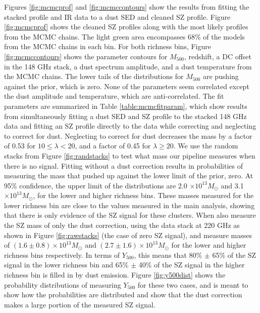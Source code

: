 \documentclass[a4paper,fleqn,usenatbib]{mnras}
\begin{document}






Figures \ref{fig:mcmcprof} and \ref{fig:mcmccontours} show the results from fitting the stacked profile and IR data to a dust SED and cleaned SZ profile. Figure \ref{fig:mcmcprof} shows the cleaned SZ profiles along with the most likely profiles from the MCMC chains. The light green area encompasses 68\% of the models from the MCMC chains in each bin.  For both richness bins, Figure \ref{fig:mcmccontours} shows the parameter contours for $M_{500}$, redshift, a DC offset in the 148 GHz stack, a dust spectrum amplitude, and a dust temperature from the MCMC chains. The lower tails of the distributions for $M_{500}$ are pushing against the prior, which is zero. None of the parameters seem correlated except the dust amplitude and temperature, which are anti-correlated. 
The fit parameters are summarized in Table \ref{table:mcmcfitparam}, which show results from simultaneously fitting a dust SED and SZ profile to the stacked 148 GHz data and fitting an SZ profile directly to the data while correcting and neglecting to correct for dust. Neglecting to correct for dust decreases the mass by a factor of 0.53 for $10 \leq \lambda < 20$, and a factor of 0.45 for $\lambda \geq 20$. %
We use the random stacks from Figure \ref{fig:randstacks} to test what mass our pipeline measures when there is no signal. Fitting without a dust correction results in probabilities of measuring the mass that pushed up against the lower limit of the prior, zero. At 95\% confidence, the upper limit of the distributions are 2.0 $\times 10^{13} M_{\odot}$ and 3.1 $\times 10^{13} M_{\odot}$, for the lower and higher richness bins. These masses measured for the lower richness bin are close to the values measured in the main analysis, showing that there is only evidence of the SZ signal for these clusters. 
When also measure the SZ mass of only the dust correction, using the data stack at 220 GHz as shown in Figure \ref{fig:rawstacks} (the case of zero SZ signal), and measure masses of $(1.6 \pm 0.8) \times 10^{13} M_{\odot}$ and $(2.7 \pm 1.6) \times 10^{13} M_{\odot}$ for the lower and higher richness bins respectively. In terms of $Y_{500}$, this means that 80\% $\pm$ 65\% of the SZ signal in the lower richness bin and 65\% $\pm$ 40\% of the SZ signal in the higher richness bin is filled in by dust emission. Figure \ref{fig:y500dist} shows the probability distributions of measuring $Y_{500}$ for these two cases, and is meant to show how the probabilities are distributed and show that the dust correction makes a large portion of the measured SZ signal. 
\end{document}
